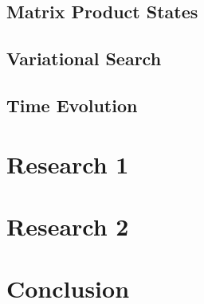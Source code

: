 \documentclass[a4paper,twoside,12pt]{hwthesis}
\newcommand*{\chappath}{../../include/chapters}
\newcommand*{\refpath}{../../include/refs}
\begin{document}
\section{Matrix Product States}

\section{Variational Search}



\section{Time Evolution}

\chapter{Research 1}

\chapter{Research 2}

\chapter{Conclusion}



\end{document}
